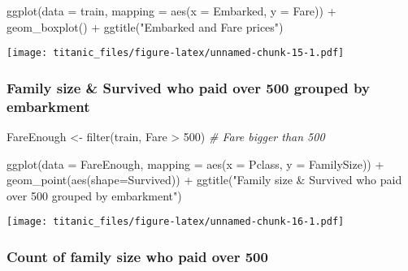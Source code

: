 \documentclass[
]{article}
\newenvironment{Shaded}{\begin{snugshade}}{\end{snugshade}}
\newcommand{\AttributeTok}[1]{\textcolor[rgb]{0.77,0.63,0.00}{#1}}
\newcommand{\CommentTok}[1]{\textcolor[rgb]{0.56,0.35,0.01}{\textit{#1}}}
\newcommand{\DecValTok}[1]{\textcolor[rgb]{0.00,0.00,0.81}{#1}}
\newcommand{\FunctionTok}[1]{\textcolor[rgb]{0.00,0.00,0.00}{#1}}
\newcommand{\NormalTok}[1]{#1}
\newcommand{\OtherTok}[1]{\textcolor[rgb]{0.56,0.35,0.01}{#1}}
\newcommand{\SpecialCharTok}[1]{\textcolor[rgb]{0.00,0.00,0.00}{#1}}
\newcommand{\StringTok}[1]{\textcolor[rgb]{0.31,0.60,0.02}{#1}}
\begin{document}
\begin{Shaded}
\begin{Highlighting}[]
\FunctionTok{ggplot}\NormalTok{(}\AttributeTok{data =}\NormalTok{ train, }\AttributeTok{mapping =} \FunctionTok{aes}\NormalTok{(}\AttributeTok{x =}\NormalTok{ Embarked, }\AttributeTok{y =}\NormalTok{ Fare)) }\SpecialCharTok{+}
  \FunctionTok{geom\_boxplot}\NormalTok{() }\SpecialCharTok{+}
  \FunctionTok{ggtitle}\NormalTok{(}\StringTok{"Embarked and Fare prices"}\NormalTok{)}
\end{Highlighting}
\end{Shaded}

\texttt{[image: titanic\_files/figure-latex/unnamed-chunk-15-1.pdf]}

\hypertarget{family-size-survived-who-paid-over-500-grouped-by-embarkment}{%
\subsubsection{Family size \& Survived who paid over 500 grouped by
embarkment}\label{family-size-survived-who-paid-over-500-grouped-by-embarkment}}

\begin{Shaded}
\begin{Highlighting}[]
\NormalTok{FareEnough }\OtherTok{\textless{}{-}} \FunctionTok{filter}\NormalTok{(train, Fare }\SpecialCharTok{\textgreater{}} \DecValTok{500}\NormalTok{) }\CommentTok{\# Fare bigger than 500}

\FunctionTok{ggplot}\NormalTok{(}\AttributeTok{data =}\NormalTok{ FareEnough, }\AttributeTok{mapping =} \FunctionTok{aes}\NormalTok{(}\AttributeTok{x =}\NormalTok{ Pclass, }\AttributeTok{y =}\NormalTok{ FamilySize)) }\SpecialCharTok{+}
  \FunctionTok{geom\_point}\NormalTok{(}\FunctionTok{aes}\NormalTok{(}\AttributeTok{shape=}\NormalTok{Survived)) }\SpecialCharTok{+}
  \FunctionTok{ggtitle}\NormalTok{(}\StringTok{"Family size \& Survived who paid over 500 grouped by embarkment"}\NormalTok{)}
\end{Highlighting}
\end{Shaded}

\texttt{[image: titanic\_files/figure-latex/unnamed-chunk-16-1.pdf]}

\hypertarget{count-of-family-size-who-paid-over-500}{%
\subsubsection{Count of family size who paid over
500}\label{count-of-family-size-who-paid-over-500}}
\end{document}
